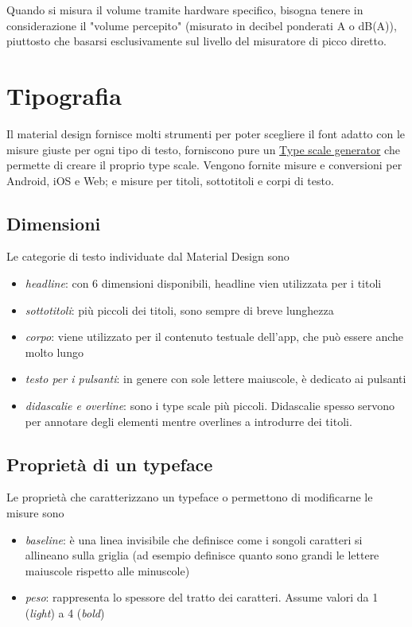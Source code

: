 \documentclass[12pt, a4paper]{report}
\begin{document}
                Quando si misura il volume tramite hardware specifico, bisogna tenere in considerazione il "volume percepito" (misurato in decibel ponderati A o dB(A)), piuttosto che basarsi esclusivamente sul livello del misuratore di picco diretto.




	\section{Tipografia}
		Il material design fornisce molti strumenti per poter scegliere il font adatto con le misure giuste per ogni tipo di testo, forniscono pure un \href{https://material.io/design/typography/the-type-system.html#type-scale}{Type scale generator} che permette di creare il proprio type scale.
		Vengono fornite misure e conversioni per Android, iOS e Web; e misure per titoli, sottotitoli e corpi di testo.

		\subsection{Dimensioni}
		Le categorie di testo individuate dal Material Design sono
		\begin{itemize}
			\item \textit{headline}: con 6 dimensioni disponibili, headline vien utilizzata per i titoli
			\item \textit{sottotitoli}: più piccoli dei titoli, sono sempre di breve lunghezza
			\item \textit{corpo}: viene utilizzato per il contenuto testuale dell'app, che può essere anche molto lungo
			\item \textit{testo per i pulsanti}: in genere con sole lettere maiuscole, è dedicato ai pulsanti
			\item \textit{didascalie e overline}: sono i type scale più piccoli. Didascalie spesso servono per annotare degli elementi mentre overlines a introdurre dei titoli.
		\end{itemize}

	\subsection{Proprietà di un typeface}
		Le proprietà che caratterizzano un typeface o permettono di modificarne le misure sono
		\begin{itemize}
			\item \textit{baseline}: è una linea invisibile che definisce come i songoli caratteri si allineano sulla griglia (ad esempio definisce quanto sono grandi le lettere maiuscole rispetto alle minuscole)
			\item \textit{peso}: rappresenta lo spessore del tratto dei caratteri. Assume valori da 1 (\textit{light}) a 4 (\textit{bold})
		\end{itemize}
\end{document}
